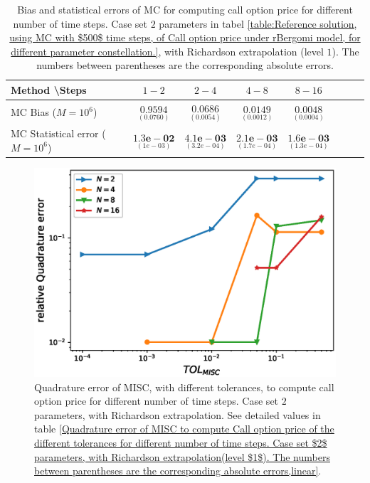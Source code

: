 \begin{table}[h!]
	\centering
	\begin{tabular}{l*{6}{c}r}
		Method \textbackslash  Steps            & $1-2$ & $2-4$ & $4-8$ & $8-16$  \\
		\hline
		MC Bias ($M=10^6$)  &$\underset{( 0.0760)}{\mathbf{0.9594}}$  & $\underset{( 0.0054)}{\mathbf{0.0686}}$  & $\underset{(   0.0012)}{\mathbf{0.0149}}$  & $\underset{(  0.0004)}{\mathbf{0.0048}}$ \\	
		
		MC Statistical error ($M=10^6$)   & $\underset{( 1e-03)}{\mathbf{1.3e-02}}$  & $\underset{(   3.2e-04)}{\mathbf{4.1e-03}}$  & $\underset{(  1.7e-04)}{\mathbf{2.1e-03}}$ & $\underset{(  1.3e-04)}{\mathbf{1.6e-03}}$ \\	
		\hline
	\end{tabular}
	\caption{Bias and statistical errors of MC   for computing call option price  for different number of time steps. Case set $2$ parameters in tabel \ref{table:Reference solution, using MC with $500$ time steps, of Call option price under rBergomi model, for different parameter constellation.}, with Richardson extrapolation (level $1$). The numbers between parentheses are the corresponding absolute errors.}
	\label{Bias and Statistical errors of MC ($M=10^6$)  for computing Call option price  for different number of time steps. Case set $2$ parameters, with Richardson extrapolation (level1). The numbers between parentheses are the corresponding absolute errors.}
\end{table}


\FloatBarrier





\begin{figure}[h!]
	\centering
	\includegraphics[width=0.4\linewidth]{./figures/rBergomi_MISC_quadratre_error/vs_TOL/set2/relative_quad_error_wrt_MISC_TOL_set2_with_rich_linear}
	
	
	\caption{Quadrature error of MISC, with different tolerances,  to compute call option price for different number of time steps. Case  set $2$ parameters, with Richardson extrapolation.  See detailed values  in table \ref{Quadrature error of MISC to compute Call option price of the different tolerances for different number of time steps. Case set $2$ parameters, with Richardson extrapolation(level $1$). The numbers between parentheses are the corresponding absolute errors,linear}.}
	\label{fig:Quadrature_error_set2_linear_rich}
\end{figure}


